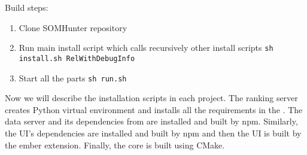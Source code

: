 Build steps:

\begin{enumerate}
  \item Clone SOMHunter repository
  \item Run main install script which calls recursively other install scripts \lstinline{sh install.sh RelWithDebugInfo}
  \item Start all the parts \lstinline{sh run.sh}
\end{enumerate}

Now we will describe the installation scripts in each project. The ranking server creates Python virtual environment and installs all the requirements in the . The data server and its dependencies from  are installed and built by npm. Similarly, the UI's dependencies are installed and built by npm and then the UI is built by the ember extension. Finally, the core is built using CMake.
